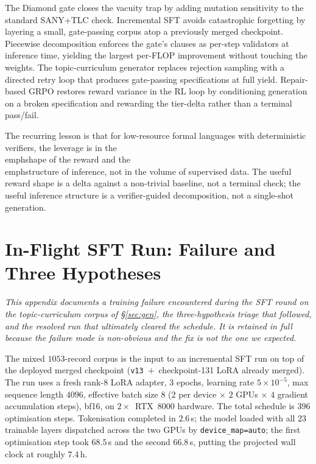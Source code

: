 \documentclass[11pt]{article}
\begin{document}
The Diamond gate closes the vacuity trap by adding mutation sensitivity
to the standard SANY+TLC check. Incremental SFT avoids catastrophic
forgetting by layering a small, gate-passing corpus atop a previously
merged checkpoint. Piecewise decomposition enforces the gate's clauses
as per-step validators at inference time, yielding the largest per-FLOP
improvement without touching the weights. The topic-curriculum generator
replaces rejection sampling with a directed retry loop that produces
gate-passing specifications at full yield. Repair-based GRPO restores
reward variance in the RL loop by conditioning generation on a broken
specification and rewarding the tier-delta rather than a terminal
pass/fail.

The recurring lesson is that for low-resource formal languages with
deterministic verifiers, the leverage is in the \\emph{shape} of the
reward and the \\emph{structure} of inference, not in the volume of
supervised data. The useful reward shape is a delta against a
non-trivial baseline, not a terminal check; the useful inference
structure is a verifier-guided decomposition, not a single-shot
generation.

\appendix

\section{In-Flight SFT Run: Failure and Three Hypotheses}
\label{sec:sftv3}

\noindent\textit{This appendix documents a training failure
encountered during the SFT round on the topic-curriculum corpus of
\S\ref{sec:gen}, the three-hypothesis triage that followed, and the
resolved run that ultimately cleared the schedule. It is retained in
full because the failure mode is non-obvious and the fix is not the
one we expected.}\medskip

The mixed $1053$-record corpus is the input to an incremental SFT run
on top of the deployed merged checkpoint
(\texttt{v13}~$+$~checkpoint-131 LoRA already merged). The run uses a
fresh rank-$8$ LoRA adapter, $3$ epochs, learning rate
$5\!\times\!10^{-5}$, max sequence length $4096$, effective batch size
$8$ ($2$ per device $\times$ $2$ GPUs $\times$ $4$ gradient
accumulation steps), bf16, on $2{\times}$~RTX~8000 hardware. The total
schedule is $396$ optimisation steps. Tokenisation completed in
$2.6$\,s; the model loaded with all $23$ trainable layers dispatched
across the two GPUs by \texttt{device\_map=auto}; the first
optimisation step took $68.5$\,s and the second $66.8$\,s, putting
the projected wall clock at roughly $7.4$\,h.
\end{document}
